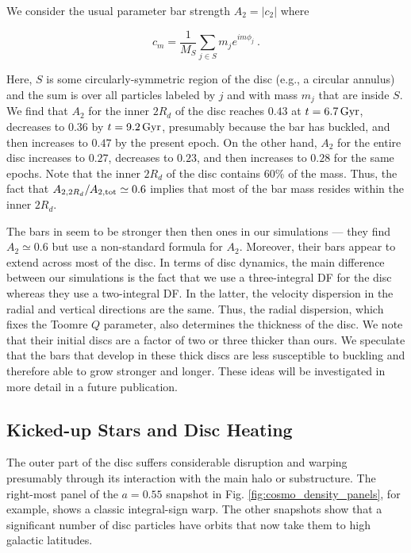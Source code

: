 We consider the usual parameter bar strength $A_2 = 
|c_2|$ where

\begin{equation}
c_m = \frac{1}{M_S}\sum_{j\in S} m_j e^{im\phi_j}~.
\end{equation}

\noindent Here, $S$ is some circularly-symmetric region of the disc
(e.g., a circular annulus) and the sum is over all particles labeled
by $j$ and with mass $m_j$ that are inside $S$.  We find that
$A_2$ for the inner $2R_d$ of the disc reaches $0.43$ at $t=6.7\,{\rm
  Gyr}$, decreases to $0.36$ by $t= 9.2\,{\rm Gyr}$, presumably
because the bar has buckled, and then increases to $0.47$ by the
present epoch.  On the other hand, $A_2$ for the entire disc increases
to $0.27$, decreases to $0.23$, and then increases to $0.28$ for the
same epochs.  Note that the inner $2R_d$ of the disc contains $60\%$
of the mass.  Thus, the fact that $A_{2,2R_d}/A_{2,{\rm tot}}\simeq
  0.6$ implies that most of the bar mass resides within the inner
  $2R_d$.

The bars in \citet{YurinSpringelStellarDisks} seem to be stronger then
then ones in our simulations --- they find $A_2\simeq 0.6$ but use a
non-standard formula for $A_2$.  Moreover, their bars appear to extend
across most of the disc.  In terms of disc dynamics, the main
difference between our simulations is the fact that we use a
three-integral DF for the disc whereas they use a two-integral DF.  In
the latter, the velocity dispersion in the radial and vertical
directions are the same.  Thus, the radial dispersion, which fixes the
Toomre $Q$ parameter, also determines the thickness of the disc.  We
note that their initial discs are a factor of two or three thicker
than ours.  We speculate that the bars that develop in these thick
discs are less susceptible to buckling and therefore able to grow
stronger and longer.  These ideas will be investigated in more detail
in a future publication.

\subsection{Kicked-up Stars and Disc Heating}

The outer part of the disc suffers considerable disruption and warping
presumably through its interaction with the main halo or substructure.  The right-most
panel of the $a=0.55$ snapshot in Fig. \ref{fig:cosmo_density_panels}, for example, shows a classic
integral-sign warp.  The other snapshots show that a significant
number of disc particles have orbits that now take them to high
galactic latitudes.

